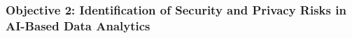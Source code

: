 \documentclass[a4paper,11pt]{article}
\newcommand{\project}[1]{\textbf{#1}\xspace}
\newcommand{\SECURITY}{\project{Elysian}}
\newcommand{\TheProject}{\SECURITY}
\begin{document}


\subsubsection*{Objective 2: Identification of Security and Privacy Risks in AI-Based Data Analytics}
\vspace{-6pt}
\end{document}
